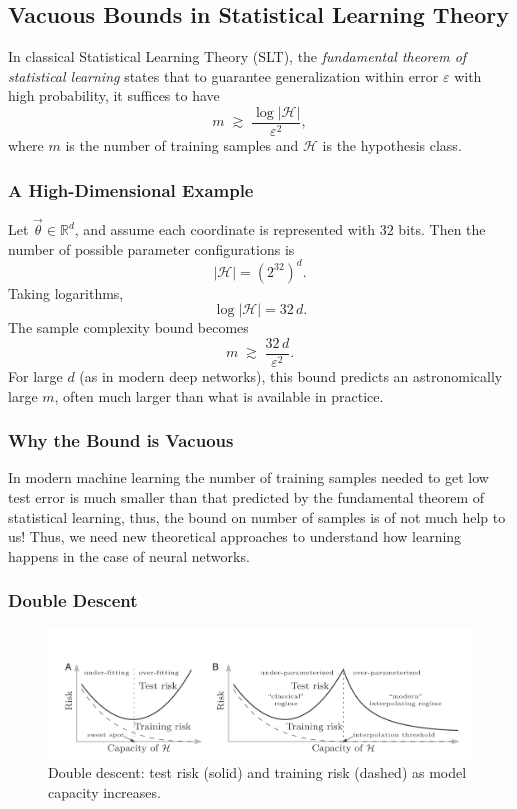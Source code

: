 \documentclass[11pt]{article}
\theoremstyle{plain}
\begin{document}
\subsection{Vacuous Bounds in Statistical Learning Theory}

In classical Statistical Learning Theory (SLT), the \textit{fundamental theorem of statistical learning} states that to guarantee generalization within error $\varepsilon$ with high probability, it suffices to have
\[
m \;\gtrsim\; \frac{\log |\mathcal{H}|}{\varepsilon^2},
\]
where $m$ is the number of training samples and $\mathcal{H}$ is the hypothesis class.

\subsubsection*{A High-Dimensional Example}
Let $\vec{\theta} \in \mathbb{R}^d$, and assume each coordinate is represented with $32$ bits. Then the number of possible parameter configurations is
\[
|\mathcal{H}| = \left( 2^{32} \right)^{d}.
\]
Taking logarithms,
\[
\log |\mathcal{H}| = 32\,d.
\]
The sample complexity bound becomes
\[
m \;\gtrsim\; \frac{32\,d}{\varepsilon^2}.
\]
For large $d$ (as in modern deep networks), this bound predicts an astronomically large $m$, often much larger than what is available in practice.

\subsubsection*{Why the Bound is Vacuous}
In modern machine learning the number of training samples needed to get low test error is much smaller than that predicted by the fundamental theorem of statistical learning, thus, the bound on number of samples is of not much help to us! Thus, we need new theoretical approaches to understand how learning happens in the case of neural networks.

\subsubsection{Double Descent}

\begin{figure}[ht]
  \centering
  \includegraphics[width=\linewidth]{DoubleDescent.png}
  \caption{Double descent: test risk (solid) and training risk (dashed) as model capacity increases.}
  \label{fig:double-descent}
\end{figure}
\end{document}
